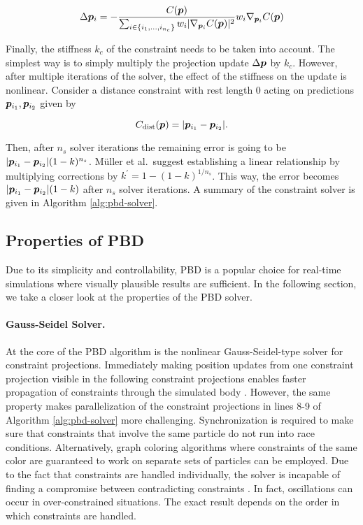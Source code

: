 \begin{equation}\label{eq:pbd-update-individual}
    \Delta \bm{p}_i = -\frac{C(\bm{p})}{\sum_{i \in \{ i_1, \ldots, i_{n_c} \}} w_i \vert \nabla_{\bm{p}_i}C(\bm{p}) \vert^2 } 
    w_i \nabla_{\bm{p}_i} C(\bm{p})
\end{equation}

Finally, the stiffness $k_c$ of the constraint needs to be taken into account. The simplest way is to simply multiply the projection update
$\Delta \bm{p}$ by $k_c$. However, after multiple iterations of the solver, the effect of the stiffness on the update is nonlinear. Consider
a distance constraint with rest length 0 acting on predictions $\bm{p}_{i_1}, \bm{p}_{i_2}$ given by

\begin{equation}\label{eq:pbd-distance}
    C_{\text{dist}}(\bm{p}) = \vert \bm{p}_{i_1} - \bm{p}_{i_2} \vert.
\end{equation}

\noindent Then, after $n_s$ solver iterations the remaining error is going to be $\vert \bm{p}_{i_1} - \bm{p}_{i_2} \vert (1-k)^{n_s}$. Müller et al.\ 
suggest establishing a linear relationship by multiplying corrections by $k^{\prime} = 1 - (1-k)^{1/n_s}$. This way, the error becomes
$\vert \bm{p}_{i_1} - \bm{p}_{i_2} \vert (1-k)$ after $n_s$ solver iterations. A summary of the constraint solver is given in Algorithm 
\ref{alg:pbd-solver}.


\subsection{Properties of PBD}\label{ss:pbd-properties}
Due to its simplicity and controllability, PBD is a popular choice for real-time simulations where visually plausible results are sufficient. 
In the following section, we take a closer look at the properties of the PBD solver.

\paragraph{Gauss-Seidel Solver.}
At the core of the PBD algorithm is the nonlinear Gauss-Seidel-type solver for constraint projections. Immediately making position
updates from one constraint projection visible in the following constraint projections enables faster propagation of 
constraints through the simulated body \cite{mueller2006}. However, the same property makes parallelization of the constraint projections 
in lines 8-9 of Algorithm \ref{alg:pbd-solver}
more challenging. Synchronization is required to make sure that constraints that involve the same particle do not run into race conditions. 
Alternatively, graph coloring algorithms where constraints of the same color are guaranteed to work on separate sets of particles can be employed. 
Due to the fact that constraints are handled individually, the solver is incapable of finding a 
compromise between contradicting constraints \cite{mueller2006, bouaziz2014}. In fact, oscillations can occur in over-constrained situations. 
The exact result depends on the order in which constraints are handled.


